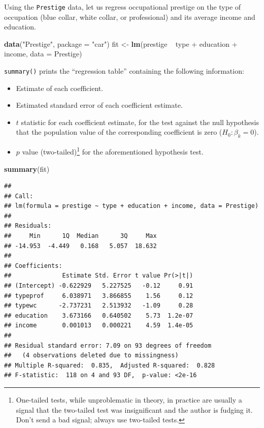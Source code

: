 \documentclass[12pt,oneside,openany]{book}
\newenvironment{Shaded}{\begin{snugshade}}{\end{snugshade}}
\newcommand{\KeywordTok}[1]{\textcolor[rgb]{0.13,0.29,0.53}{\textbf{{#1}}}}
\newcommand{\DataTypeTok}[1]{\textcolor[rgb]{0.13,0.29,0.53}{{#1}}}
\newcommand{\StringTok}[1]{\textcolor[rgb]{0.31,0.60,0.02}{{#1}}}
\newcommand{\NormalTok}[1]{{#1}}
\providecommand{\tightlist}{%
  \setlength{\itemsep}{0pt}\setlength{\parskip}{0pt}}
\let\rmarkdownfootnote\footnote%
\def\footnote{\protect\rmarkdownfootnote}
\begin{document}
Using the \texttt{Prestige} data, let us regress occupational prestige
on the type of occupation (blue collar, white collar, or professional)
and its average income and education.

\begin{Shaded}
\begin{Highlighting}[]
\KeywordTok{data}\NormalTok{(}\StringTok{"Prestige"}\NormalTok{, }\DataTypeTok{package =} \StringTok{"car"}\NormalTok{)}
\NormalTok{fit <-}\StringTok{ }\KeywordTok{lm}\NormalTok{(prestige ~}\StringTok{ }\NormalTok{type +}\StringTok{ }\NormalTok{education +}\StringTok{ }\NormalTok{income, }\DataTypeTok{data =} \NormalTok{Prestige)}
\end{Highlighting}
\end{Shaded}

\texttt{summary()} prints the ``regression table'' containing the
following information:

\begin{itemize}
\tightlist
\item
  Estimate of each coefficient.
\item
  Estimated standard error of each coefficient estimate.
\item
  \(t\) statistic for each coefficient estimate, for the test against
  the null hypothesis that the population value of the corresponding
  coefficient is zero (\(H_0 : \beta_k = 0\)).
\item
  \(p\) value (two-tailed)\footnote{One-tailed tests, while
    unproblematic in theory, in practice are usually a signal that the
    two-tailed test was insignificant and the author is fudging it.
    Don't send a bad signal; always use two-tailed tests.} for the
  aforementioned hypothesis test.
\end{itemize}

\begin{Shaded}
\begin{Highlighting}[]
\KeywordTok{summary}\NormalTok{(fit)}
\end{Highlighting}
\end{Shaded}

\begin{verbatim}
## 
## Call:
## lm(formula = prestige ~ type + education + income, data = Prestige)
## 
## Residuals:
##     Min      1Q  Median      3Q     Max 
## -14.953  -4.449   0.168   5.057  18.632 
## 
## Coefficients:
##              Estimate Std. Error t value Pr(>|t|)
## (Intercept) -0.622929   5.227525   -0.12     0.91
## typeprof     6.038971   3.866855    1.56     0.12
## typewc      -2.737231   2.513932   -1.09     0.28
## education    3.673166   0.640502    5.73  1.2e-07
## income       0.001013   0.000221    4.59  1.4e-05
## 
## Residual standard error: 7.09 on 93 degrees of freedom
##   (4 observations deleted due to missingness)
## Multiple R-squared:  0.835,  Adjusted R-squared:  0.828 
## F-statistic:  118 on 4 and 93 DF,  p-value: <2e-16
\end{verbatim}
\end{document}
